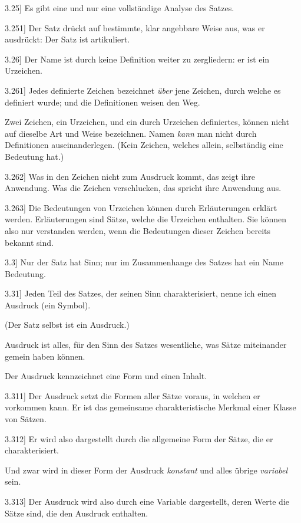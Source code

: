 \documentclass[12pt,oneside]{book}[2007/10/19]
\newcommand{\PropERef}[1]{\hyperref[PropE:#1]{#1}}
\newcommand{\PropositionG}[2]{%
  \item[\phantomsection\label{PropG:#1}\PropERef{#1}] #2%
}
\newcommand{\DPtypo}[2]{#2}
\newcommand{\Emph}[1]{\emph{#1}}%
\begin{document}
\begin{propositions}
\PropositionG{3.25}
{Es gibt eine und nur eine vollständige Analyse
des Satzes.}


\PropositionG{3.251}
{Der Satz drückt auf bestimmte, klar angebbare
Weise aus, was er ausdrückt: Der Satz ist artikuliert.}


\PropositionG{3.26}
{Der \DPtypo{name}{Name} ist durch keine Definition weiter zu
zergliedern: er ist ein Urzeichen.}


\PropositionG{3.261}
{Jedes definierte Zeichen bezeichnet \Emph{über} jene
Zeichen, durch welche es definiert wurde; und die
Definitionen weisen den Weg.

Zwei Zeichen, ein Urzeichen, und ein durch
Urzeichen definiertes, können nicht auf dieselbe
Art und Weise bezeichnen. Namen \Emph{kann} man
nicht durch Definitionen auseinanderlegen. (Kein
Zeichen, welches allein, selbständig eine Bedeutung
hat.)}


\PropositionG{3.262}
{Was in den Zeichen nicht zum Ausdruck kommt,
das zeigt ihre Anwendung. Was die Zeichen
verschlucken, das spricht ihre Anwendung aus.}


\PropositionG{3.263}
{Die Bedeutungen von Urzeichen können durch
Erläuterungen erklärt werden. Erläuterungen
sind Sätze, welche die Urzeichen enthalten. Sie
können also nur verstanden werden, wenn die
Bedeutungen dieser Zeichen bereits bekannt sind.}


\PropositionG{3.3}
{Nur der Satz hat Sinn; nur im Zusammenhange
des Satzes hat ein Name Bedeutung.}


\PropositionG{3.31}
{Jeden Teil des Satzes, der seinen Sinn charakterisiert,
nenne ich einen Ausdruck (ein Symbol).

(Der Satz selbst ist ein Ausdruck.)

Ausdruck ist alles, für den Sinn des Satzes
wesentliche, was Sätze miteinander gemein haben
können.

Der Ausdruck kennzeichnet eine Form und
einen Inhalt.}


\PropositionG{3.311}
{Der Ausdruck setzt die Formen aller Sätze
voraus, in welchen er vorkommen kann. Er ist
das gemeinsame charakteristische Merkmal einer
Klasse von Sätzen.}


\PropositionG{3.312}
{Er wird also dargestellt durch die allgemeine
Form der Sätze, die er charakterisiert.

Und zwar wird in dieser Form der Ausdruck
\Emph{konstant} und alles übrige \Emph{variabel} sein.}


\PropositionG{3.313}
{Der Ausdruck wird also durch eine Variable
\enlargethispage{6pt} %
dargestellt, deren Werte die Sätze sind, die den
Ausdruck enthalten.

}
\end{propositions}
\end{document}
